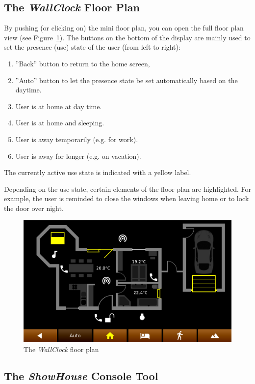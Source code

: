 \documentclass[12pt,english,parskip=half,headheight=19pt]{scrreprt}
\begin{document}
\subsection{The \textit{WallClock} Floor Plan}
\label{sec:tutorial-firststeps-floorplan}

By pushing (or clicking on) the mini floor plan, you can open the full floor plan view (see Figure~\ref{fig:tutorial-floorplan}). The buttons on the bottom of the display are mainly used to set the presence (use) state of the user (from left to right):

\begin{enumerate}
  \item ''Back'' button to return to the home screen,
  \item ''Auto'' button to let the presence state be set automatically based on the daytime.
  \item User is at home at day time.
  \item User is at home and sleeping.
  \item User is away temporarily (e.g. for work).
  \item User is away for longer (e.g. on vacation).
\end{enumerate}

The currently active use state is indicated with a yellow label.

Depending on the use state, certain elements of the floor plan are highlighted. For example, the user is reminded to close the windows when leaving home or to lock the door over night.

\begin{figure}[ht]
  \centering
  \includegraphics[width=0.7\linewidth]{figs/wallclock-floorplan-3.png}
  \caption[l]{The \textit{WallClock} floor plan}
  \label{fig:tutorial-floorplan}
\end{figure}



\subsection{The \textit{ShowHouse} Console Tool}
\label{sec:tutorial-firststeps-showhouse}
\end{document}
